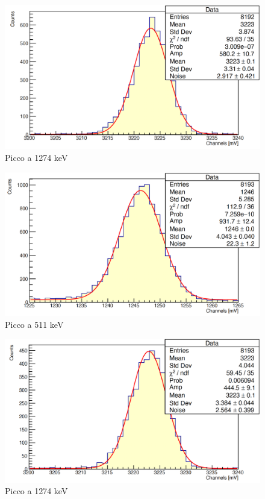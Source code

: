 \documentclass[a4paper,10pt]{article}
\begin{document}
\begin{figure}[H]
    \centering
    \includegraphics[scale=0.45]{appendice/spettri/NaA2_8}
    \caption{Picco a 1274 keV}
\end{figure}
\begin{figure}[H]
    \centering
    \includegraphics[scale=0.45]{appendice/spettri/NaA1_12}
    \caption{Picco a 511 keV}
\end{figure}
\begin{figure}[H]
    \centering
    \includegraphics[scale=0.45]{appendice/spettri/NaA2_12}
    \caption{Picco a 1274 keV}
\end{figure}
\end{document}
